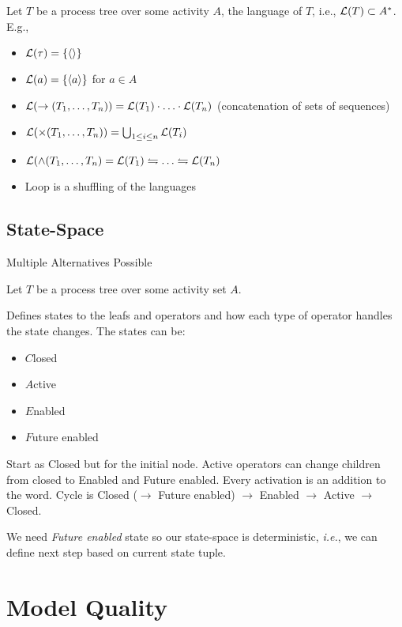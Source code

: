 Let $T$ be a process tree over some activity $A$, the language of $T$, i.e., $\mathcal{L}(T) \subset A^{*}$. E.g.,

\begin{itemize}
	\item $\mathcal{L}(\tau) = \left\{ \left< \right> \right\} $
	\item $\mathcal{L}(a) = \left\{ \left<a \right> \right\} $ for $a\in A$
	\item $\mathcal{L}(\to (T_1,\ldots,T_n)) = \mathcal{L}(T_1) \cdot \ldots \cdot  \mathcal{L}(T_n)$ (concatenation of sets of sequences)
	\item $\mathcal{L}(\times (T_1, \ldots, T_n)) = \bigcup_{1 \le i\le n} \mathcal{L}(T_i) $
	\item $\mathcal{L}( \wedge (T_1, \ldots, T_n) = \mathcal{L}(T_1) \leftrightharpoons \ldots \leftrightharpoons \mathcal{L}(T_n)$
	\item Loop is a shuffling of the languages
\end{itemize}

\subsection*{State-Space}

Multiple Alternatives Possible

Let $T$ be a process tree over some activity set $A$.

Defines states to the leafs and operators and how each type of operator handles the state changes. The states can be:
\begin{itemize}
	\item \textbf{$C$}losed
	\item \textbf{$A$}ctive
	\item  $E$nabled
	\item $F$uture enabled
\end{itemize}

Start as Closed but for the initial node. Active operators can change children from closed to Enabled and Future enabled. Every activation is an addition to the word. Cycle is Closed ($\to $ Future enabled) $\to $ Enabled $\to $ Active $\to $ Closed.

\begin{remark}
	We need \emph{Future enabled} state so our state-space is deterministic, \emph{i.e.}, we can define next step based on current state tuple.
\end{remark}

\section*{Model Quality}

